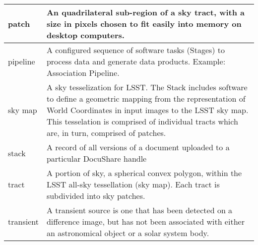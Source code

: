 \begin{longtable}{|l|p{}|}
patch & An quadrilateral sub-region of a sky \gls{tract}, with a size in pixels chosen to fit easily into memory on desktop computers. \\\hline
pipeline & A configured sequence of software tasks (Stages) to process data and generate data products. Example: \gls{Association Pipeline}. \\\hline
sky map & A sky tesselization for \gls{LSST}. The Stack includes software to define a geometric mapping from the representation of World Coordinates in input images to the \gls{LSST} \gls{sky map}. This tesselation is comprised of individual tracts which are, in turn, comprised of patches. \\\hline
stack & A record of all versions of a document uploaded to a particular \gls{DocuShare} handle \\\hline
tract & A portion of sky, a spherical convex polygon, within the \gls{LSST} all-sky tessellation (\gls{sky map}). Each \gls{tract} is subdivided into sky patches. \\\hline
transient & A \gls{transient} source is one that has been detected on a difference image, but has not been associated with either an \gls{astronomical object} or a solar system body. \\\hline
\end{longtable}
